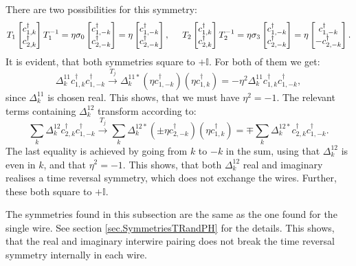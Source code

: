 There are two possibilities for this symmetry: 
\begin{equation}
T_1 \begin{bmatrix} c^\dagger_{1,k} \\ c^\dagger_{2,k} \end{bmatrix} T_1^{-1} = \eta\sigma_0 \begin{bmatrix} c^\dagger_{1,-k} \\ c^\dagger_{2,-k} \end{bmatrix} = \eta\begin{bmatrix} c^\dagger_{1,-k} \\ c^\dagger_{2,-k} \end{bmatrix}, \hspace{0.5cm} T_2 \begin{bmatrix} c^\dagger_{1,k} \\ c^\dagger_{2,k} \end{bmatrix} T_2^{-1} = \eta\sigma_3 \begin{bmatrix} c^\dagger_{1,-k} \\ c^\dagger_{2,-k} \end{bmatrix} = \eta\begin{bmatrix} c^\dagger_{1,-k} \\  - c^\dagger_{2,-k} \end{bmatrix}. \nonumber
\end{equation} 
It is evident, that both symmetries square to $+\mathbb{I}$. For both of them we get: 
\begin{equation}
\Delta^{11}_k c^\dagger_{1,k}c^\dagger_{1,-k} \overset{T_j}{\to} \Delta^{11*}_k \left(\eta c^\dagger_{1,-k}\right)\left(\eta c^\dagger_{1,k}\right) = -\eta^2\Delta^{11}_k c^\dagger_{1,k}c^\dagger_{1,-k}, \nonumber
\end{equation}
since $\Delta^{11}_k$ is chosen real. This shows, that we must have $\eta^2 = -1$. The relevant terms containing $\Delta^{12}_k$ transform according to:
\begin{equation}
\sum_k \Delta^{12}_k c^\dagger_{2,k}c^\dagger_{1,-k} \overset{T_j}{\to} \sum_k \Delta^{12*}_k \left(\pm \eta c^\dagger_{2,-k}\right)\left( \eta c^\dagger_{1,k}\right) = \mp \sum_k \Delta^{12*}_{k} c^\dagger_{2,k}c^\dagger_{1,-k}. \nonumber
\end{equation}
The last equality is achieved by going from $k$ to $-k$ in the sum, using that $\Delta^{12}_k$ is even in $k$, and that $\eta^2 = -1$. This shows, that both $\Delta^{12}_k$ real and imaginary realises a time reversal symmetry, which does not exchange the wires. Further, these both square to $+\mathbb{I}$.

The symmetries found in this subsection are the same as the one found for the single wire. See section \ref{sec.SymmetriesTRandPH} for the details. This shows, that the real and imaginary interwire pairing does not break the time reversal symmetry internally in each wire.



